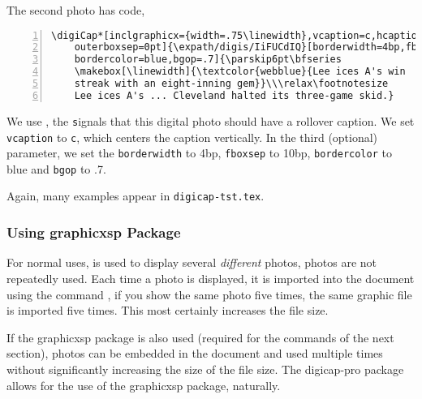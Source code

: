 \documentclass{article}
\def\expath{../examples}
\begin{document}
The second photo has code,

\begin{Verbatim}[xleftmargin=\parindent,numbers=left,fontsize=\footnotesize]
\digiCap*[inclgraphicx={width=.75\linewidth},vcaption=c,hcaption=l,
    outerboxsep=0pt]{\expath/digis/IiFUCdIQ}[borderwidth=4bp,fboxsep=10bp,
    bordercolor=blue,bgop=.7]{\parskip6pt\bfseries
    \makebox[\linewidth]{\textcolor{webblue}{Lee ices A's win
    streak with an eight-inning gem}}\\\relax\footnotesize
    Lee ices A's ... Cleveland halted its three-game skid.}
\end{Verbatim}
We use , the \texttt* signals that this digital photo should have a
rollover caption. We set \texttt{vcaption} to \texttt{c}, which centers the caption
vertically. In the third (optional) parameter, we set the \texttt{borderwidth} to 4bp,
\texttt{fboxsep} to 10bp, \texttt{bordercolor} to blue and \texttt{bgop} to .7.

Again, many examples appear in \texttt{digicap-tst.tex}.


\subsubsection{Using \textsf{graphicxsp} Package}

For normal uses,  is used to display several
\emph{different} photos, photos are not repeatedly used. Each time a
photo is displayed, it is imported into the document using the
command , if you show the same photo five times,
the same graphic file is imported five times. This most certainly
increases the file size.

If the \textsf{graphicxsp} package is also used (required for the
commands of the next section), photos can be embedded in the
document and used multiple times without significantly increasing
the size of the file size. The \textsf{digicap-pro} package allows
for the use of the \textsf{graphicxsp} package, naturally.

\def\nameKey{\textcolor{red}{name=clifflee}}
\end{document}
